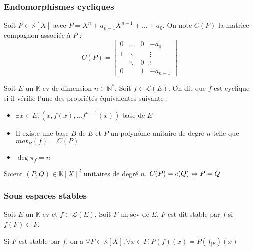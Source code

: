 \subsubsection{Endomorphismes cycliques}
\begin{defi} Soit $P\in\mathbb{K}[X]$ avec $P=X^n+a_{n-1}X^{n-1}+\ldots+a_0$. On note $C(P)$ la matrice compagnon associée à $P$ :
    \[ C(P) = \left[\begin{array}{cccc} 0 & \ldots & 0      & -a_0   \\
                                        1 & \ddots &        & \vdots \\
                                          & \ddots & 0      & \vdots \\
                                        0 &        & 1      & -a_{n-1}
              \end{array}\right] \]
\end{defi}

\begin{defi} Soit $E$ un $\mathbb{K}$ ev de dimension $n\in\mathbb{N}^*$. Soit $f\in\mathscr{L}(E)$. On dit que $f$ est cyclique si il vérifie l'une des propriétés équivalentes suivante :\begin{itemize}
    \item $\exists x\in E: (x, f(x), \ldots f^{n-1}(x))$ base de $E$
    \item Il existe une base $B$ de $E$ et $P$ un polynôme unitaire de degré $n$ telle que $mat_B(f) = C(P)$
    \item $\deg \pi_f = n$
\end{itemize}\end{defi}

\begin{prop} Soient $(P,Q)\in\mathbb{K}[X]^2$ unitaires de degré $n$. $C(P) = c(Q) \Leftrightarrow P=Q$
\end{prop}

\subsubsection{Sous espaces stables}
\begin{defi} Soit $E$ un $\mathbb{K}$ ev et $f\in\mathscr{L}(E)$. Soit $F$ un sev de $E$. $F$ est dit stable par $f$ si $f(F)\subset F$.
\end{defi}

\begin{prop} Si $F$ est stable par $f$, on a $\forall P\in\mathbb{K}[X], \forall x \in F, P(f)(x) = P(f_{|F})(x)$
\end{prop}


